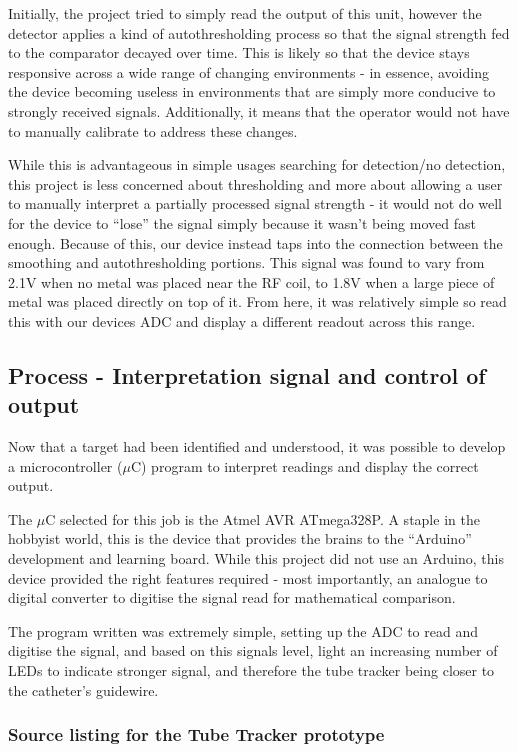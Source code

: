\documentclass[a4paper]{article}
\begin{document}
        Initially, the project tried to simply read the output of this unit, however the detector applies a kind of autothresholding process so that the signal strength fed to the comparator decayed over time.
        This is likely so that the device stays responsive across a wide range of changing environments - in essence, avoiding the device becoming useless in environments that are simply more conducive to strongly received signals.
        Additionally, it means that the operator would not have to manually calibrate to address these changes.

        While this is advantageous in simple usages searching for detection/no detection, this project is less concerned about thresholding and more about allowing a user to manually interpret a partially processed signal strength - it would not do well for the device to ``lose'' the signal simply because it wasn't being moved fast enough.
        Because of this, our device instead taps into the connection between the smoothing and autothresholding portions. This signal was found to vary from 2.1V when no metal was placed near the RF coil, to 1.8V when a large piece of metal was placed directly on top of it.
        From here, it was relatively simple so read this with our devices ADC and display a different readout across this range.

        \subsection{Process - Interpretation signal and control of output}
        Now that a target had been identified and understood, it was possible to develop a microcontroller ($\mu$C) program to interpret readings and display the correct output.

        The $\mu$C selected for this job is the Atmel AVR ATmega328P. A staple in the hobbyist world, this is the device that provides the brains to the ``Arduino'' development and learning board. While this project did not use an Arduino, this device provided the right features required - most importantly, an analogue to digital converter to digitise the signal read for mathematical comparison.

        The program written was extremely simple, setting up the ADC to read and digitise the signal, and based on this signals level, light an increasing number of LEDs to indicate stronger signal, and therefore the tube tracker being closer to the catheter's guidewire.
       
        \subsubsection{Source listing for the Tube Tracker prototype}
        
\end{document}
